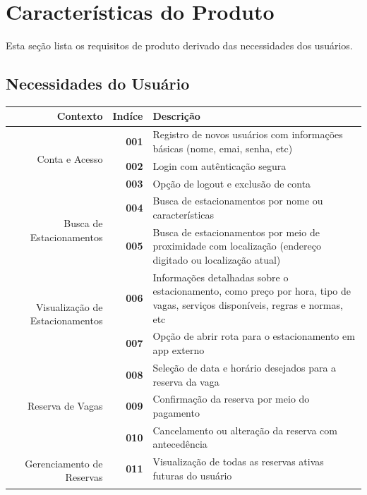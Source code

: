 \documentclass[a4paper,12pt]{article}
\begin{document}
\section{Características do Produto}

Esta seção lista os requisitos de produto derivado das necessidades dos usuários.

\subsection{Necessidades do Usuário}

\begin{table}[H]
    \begin{tabularx}{\linewidth}{ | r | r | X | }
        \hline
         \bf{Contexto} & \bf{Indíce} & \bf{Descrição} \\
        \hline
        \multirow{3}{7.5em}{Conta e Acesso}
            & \bf{001} & Registro de novos usuários com informações básicas (nome, emai, senha, etc) \\ \cline{2-3}
            & \bf{002} & Login com autênticação segura \\ \cline{2-3}
            & \bf{003} & Opção de logout e exclusão de conta \\ \hline
        \multirow{2}{7.5em}{Busca de Estacionamentos}
            & \bf{004} & Busca de estacionamentos por nome ou características  \\ \cline{2-3}
            & \bf{005} & Busca de estacionamentos por meio de proximidade com localização (endereço digitado ou localização atual) \\ \hline
        \multirow{2}{7.5em}{Visualização de Estacionamentos}
            & \bf{006} & Informações detalhadas sobre o estacionamento, como preço por hora, tipo de vagas, serviços disponíveis, regras e normas, etc \\ \cline{2-3}
            & \bf{007} & Opção de abrir rota para o estacionamento em app externo \\ \hline
        \multirow{3}{7.5em}{Reserva de Vagas}
            & \bf{008} & Seleção de data e horário desejados para a reserva da vaga \\ \cline{2-3}
            & \bf{009} & Confirmação da reserva por meio do pagamento \\ \cline{2-3}
            & \bf{010} & Cancelamento ou alteração da reserva com antecedência \\ \hline
        \multirow{3}{7.5em}{Gerenciamento de Reservas}
            & \bf{011} & Visualização de todas as reservas ativas futuras do usuário \\ \cline{2-3}

\end{tabularx}
\end{table}
\end{document}
